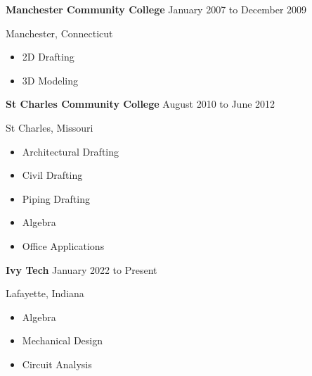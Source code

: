 \documentclass[9pt]{extarticle}
\begin{document}
\textbf{Manchester Community College} \hfill January 2007 to December 2009

Manchester, Connecticut

\begin{multicols}{3}
\begin{itemize}
    \item 2D Drafting
    \item 3D Modeling
\end{itemize}
\end{multicols}

\textbf{St Charles Community College} \hfill August 2010 to June 2012

St Charles, Missouri

\begin{multicols}{3}
\begin{itemize}
    \item Architectural Drafting
    \item Civil Drafting
    \item Piping Drafting
    \item Algebra
    \item Office Applications
\end{itemize}
\end{multicols}

\textbf{Ivy Tech} \hfill January 2022 to Present

Lafayette, Indiana

\begin{multicols}{3}
\begin{itemize}
    \item Algebra
    \item Mechanical Design
    \item Circuit Analysis
\end{itemize}
\end{multicols}
\end{document}
